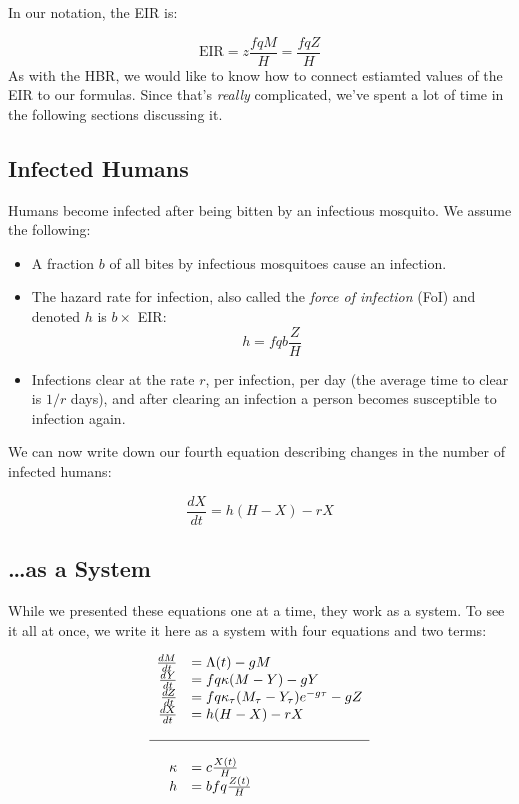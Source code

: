 \documentclass[
]{book}
\begin{document}
In our notation, the EIR is:

\[\mbox{EIR} = z \frac{fqM}{H} = \frac{fqZ}{H}\]
As with the HBR, we would like to know how to connect estiamted values of the EIR to our formulas. Since that's \emph{really} complicated, we've spent a lot of time in the following sections discussing it.

\hypertarget{RossEqn}{%
\subsection{Infected Humans}\label{RossEqn}}

Humans become infected after being bitten by an infectious mosquito. We assume the following:

\begin{itemize}
\item
  A fraction \(b\) of all bites by infectious mosquitoes cause an infection.
\item
  The hazard rate for infection, also called the \emph{force of infection} (FoI) and denoted \(h\) is \(b \times\) EIR: \[h = fqb \frac{Z}{H}\]
\item
  Infections clear at the rate \(r\), per infection, per day (the average time to clear is \(1/r\) days), and after clearing an infection a person becomes susceptible to infection again.
\end{itemize}

We can now write down our fourth equation describing changes in the number of infected humans:

\begin{equation}
\frac{dX}{dt} = h (H-X) - r X 
\end{equation}

\hypertarget{as-a-system}{%
\subsection{\ldots as a System}\label{as-a-system}}

While we presented these equations one at a time, they work as a system. To see it all at once, we write it here as a system with four equations and two terms:

\begin{equation}
\begin{array}{rl}
\frac{dM}{dt} &= \Lambda(t) - g M \\
\frac{dY}{dt} &= fq\kappa(M-Y) - g Y \\
\frac{dZ}{dt} &= fq\kappa_\tau(M_\tau-Y_\tau)e^{-g\tau} - g Z \\
\frac{dX}{dt} &= h (H-X) - rX  \\ \\ \hline \\ 
\kappa &= c \frac{X(t)}{H} \\
h &= b fq \frac{Z(t)}{H} \\
\end{array}
\end{equation}
\end{document}
